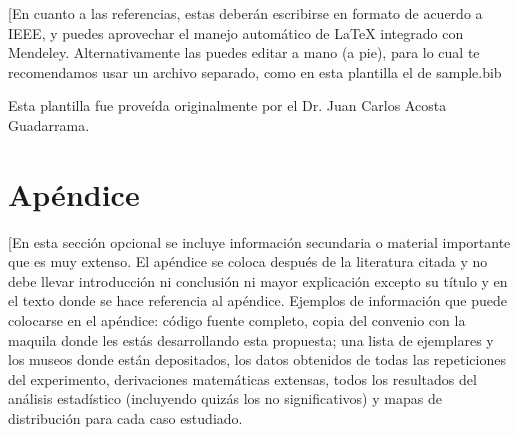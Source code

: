 \documentclass[final,12pt]{article}
\begin{document}
[En cuanto a las referencias, estas deberán escribirse en formato de acuerdo a IEEE, y puedes aprovechar el manejo automático de \LaTeX\xspace integrado con Mendeley. Alternativamente las puedes editar a mano (a pie), para lo cual te recomendamos usar un archivo separado, como en esta plantilla el de sample.bib

Esta plantilla fue proveída originalmente por el Dr. Juan Carlos Acosta Guadarrama.






\clearpage
\appendix


\section{Apéndice}
[En esta sección opcional se incluye información secundaria o material importante que es muy extenso. El apéndice se coloca después de la literatura citada y no debe llevar introducción ni conclusión ni mayor explicación excepto su título y en el texto donde se hace referencia al apéndice. 
Ejemplos de información que puede colocarse en el apéndice: código fuente completo, copia del  convenio con la maquila donde les estás desarrollando esta propuesta; una lista de ejemplares y los museos donde están depositados, los datos obtenidos de todas las repeticiones del experimento, derivaciones matemáticas extensas, todos los resultados del análisis estadístico (incluyendo quizás los no significativos) y mapas de distribución para cada caso estudiado. 

 
\end{document}
